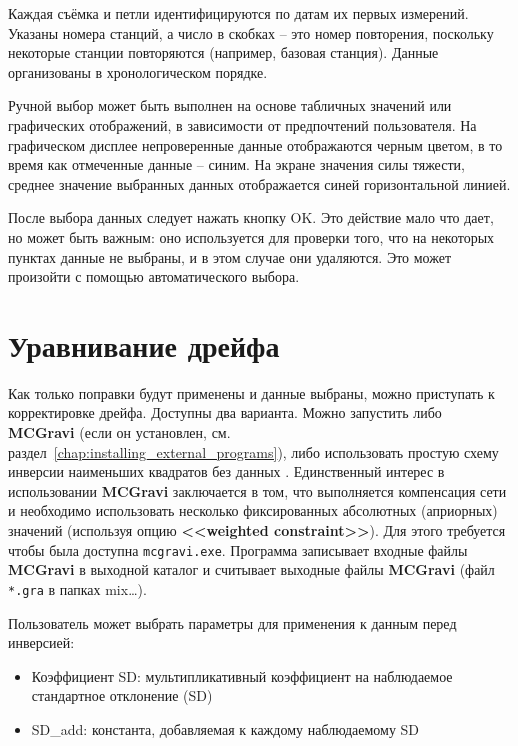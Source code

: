 Каждая съёмка и петли идентифицируются по датам их первых измерений.
Указаны номера станций, а число в скобках -- это номер повторения, поскольку
некоторые станции повторяются (например, базовая станция). Данные организованы в
хронологическом порядке.

Ручной выбор может быть выполнен на основе табличных значений или графических
отображений, в зависимости от предпочтений пользователя. На графическом дисплее
непроверенные данные отображаются черным цветом, в то время как отмеченные
данные -- синим. На экране значения силы тяжести, среднее значение выбранных данных
отображается синей горизонтальной линией.

После выбора данных следует нажать кнопку OK. Это действие мало что дает, но
может быть важным: оно используется для проверки того, что на некоторых пунктах 
данные не выбраны, и в этом случае они удаляются. Это может произойти с помощью
автоматического выбора.

\section[Уравнивание дрейфа]{Уравнивание дрейфа}
\label{sec:drift_adjustment}

Как только поправки будут применены и данные выбраны, можно приступать к
корректировке дрейфа. Доступны два варианта. Можно запустить либо
\textbf{\textsf{MCGravi}} \cite{beilin_2006} (если он установлен, см.
раздел~\ref{chap:installing_external_programs}), либо использовать простую схему
инверсии наименьших квадратов без данных \cite{hwang_adjustment_2002}.
Единственный интерес в использовании \textbf{\textsf{MCGravi}} заключается в
том, что выполняется компенсация сети и необходимо использовать несколько
фиксированных абсолютных (априорных) значений (используя опцию
\textbf{<<weighted constraint>>}). Для этого требуется чтобы была доступна
\verb|mcgravi.exe|. Программа записывает входные файлы \textbf{\textsf{MCGravi}}
в выходной каталог и считывает выходные файлы \textbf{\textsf{MCGravi}} (файл
\verb|*.gra| в папках mix\dots). 

Пользователь может выбрать параметры для применения к данным перед инверсией:
\begin{itemize}
    \item Коэффициент SD: мультипликативный коэффициент на наблюдаемое
    стандартное отклонение (SD)
    
    \item SD\_add: константа, добавляемая к каждому наблюдаемому SD
\end{itemize}

